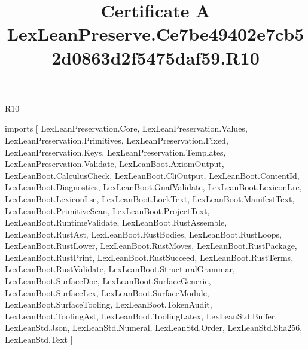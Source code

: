 \begin{lexlean}{R10}
\title{Certificate A LexLeanPreserve.Ce7be49402e7cb52d0863d2f5475daf59.R10}
\begin{coremodule}
imports [
  LexLeanPreservation.Core,
  LexLeanPreservation.Values,
  LexLeanPreservation.Primitives,
  LexLeanPreservation.Fixed,
  LexLeanPreservation.Keys,
  LexLeanPreservation.Templates,
  LexLeanPreservation.Validate,
  LexLeanBoot.AxiomOutput,
  LexLeanBoot.CalculusCheck,
  LexLeanBoot.CliOutput,
  LexLeanBoot.ContentId,
  LexLeanBoot.Diagnostics,
  LexLeanBoot.GnafValidate,
  LexLeanBoot.LexiconLre,
  LexLeanBoot.LexiconLse,
  LexLeanBoot.LockText,
  LexLeanBoot.ManifestText,
  LexLeanBoot.PrimitiveScan,
  LexLeanBoot.ProjectText,
  LexLeanBoot.RuntimeValidate,
  LexLeanBoot.RustAssemble,
  LexLeanBoot.RustAst,
  LexLeanBoot.RustBodies,
  LexLeanBoot.RustLoops,
  LexLeanBoot.RustLower,
  LexLeanBoot.RustMoves,
  LexLeanBoot.RustPackage,
  LexLeanBoot.RustPrint,
  LexLeanBoot.RustSucceed,
  LexLeanBoot.RustTerms,
  LexLeanBoot.RustValidate,
  LexLeanBoot.StructuralGrammar,
  LexLeanBoot.SurfaceDoc,
  LexLeanBoot.SurfaceGeneric,
  LexLeanBoot.SurfaceLex,
  LexLeanBoot.SurfaceModule,
  LexLeanBoot.SurfaceTooling,
  LexLeanBoot.TokenAudit,
  LexLeanBoot.ToolingAst,
  LexLeanBoot.ToolingLatex,
  LexLeanStd.Buffer,
  LexLeanStd.Json,
  LexLeanStd.Numeral,
  LexLeanStd.Order,
  LexLeanStd.Sha256,
  LexLeanStd.Text
]


\end{coremodule}
\end{lexlean}
